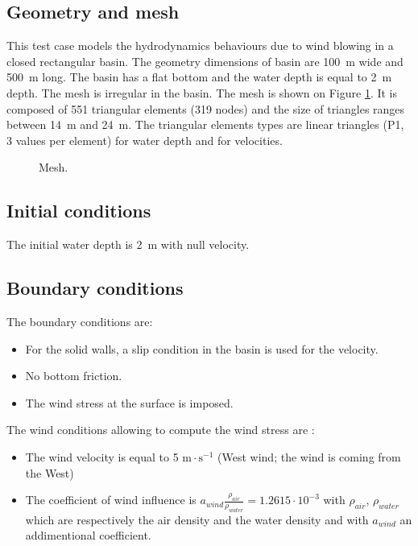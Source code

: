 \subsection{Geometry and mesh}

This test case models the hydrodynamics behaviours due to wind blowing 
in a closed rectangular basin. The geometry dimensions of basin are 100~m wide 
and  500~m long. The basin has a flat bottom and the water depth is equal to 2~m depth. 
The mesh is irregular in the basin. The mesh is shown on Figure \ref{t2d:wind:fig:mesh}. 
It is composed of 551 triangular elements (319 nodes) and the size of triangles
ranges between 14~m and 24~m. The triangular elements types are linear triangles 
(P1, 3 values per element) for water depth and for velocities.

\begin{figure}[!htbp]
 \centering
 \caption{Mesh.}
 \label{t2d:wind:fig:mesh}
\end{figure}

\subsection{Initial conditions}

The initial water depth is 2~m with null velocity.

\subsection{Boundary conditions}

The boundary conditions are:
\begin{itemize}
\item For the solid walls, a slip condition in the basin is used for the velocity.
\item No bottom friction.
\item The wind stress at the surface is imposed.
\end{itemize}
The wind conditions allowing to compute the wind stress are :
\begin{itemize}
\item The wind velocity is equal to 5 $\text{m}\cdot\text{s}^{-1}$ 
(West wind; the wind is coming from the West)
\item The coefficient of wind influence is
 $a_{wind} \frac{\rho_{air}}{\rho_{water}} = 1.2615 \cdot 10^{-3}$ 
 with $\rho_{air}$, $\rho_{water}$ which are respectively the air density 
 and the water density and with $a_{wind}$ an addimentional coefficient.
\end{itemize}

